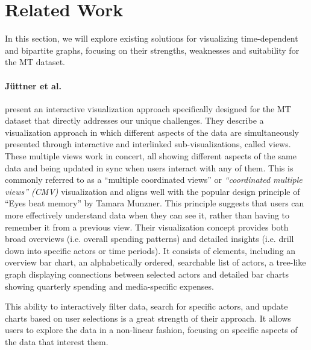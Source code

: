 \documentclass{vgtc}                          %
\begin{document}
\section{Related Work} %


In this section, we will explore existing solutions for visualizing time-dependent and bipartite graphs, focusing on their strengths, weaknesses and suitability for the MT dataset.

\paragraph{Jüttner et al.} \cite{Jttner2017MediaTI} present an interactive visualization approach specifically designed for the MT dataset that directly addresses our unique challenges.
They describe a visualization approach in which different aspects of the data are simultaneously presented through interactive and interlinked sub-visualizations, called views. These multiple views work in concert, all showing different aspects of the same data and being updated in sync when users interact with any of them. This is commonly referred to as a ``multiple coordinated views'' or \textit{``coordinated multiple views'' (CMV)} \cite{roberts2007state} visualization and aligns well with the popular design principle of ``Eyes beat memory'' by Tamara Munzner. This principle suggests that users can more effectively understand data when they can see it, rather than having to remember it from a previous view. Their visualization concept provides both broad overviews (i.e. overall spending patterns) and detailed insights (i.e. drill down into specific actors or time periods). It consists of elements, including an overview bar chart, an alphabetically ordered, searchable list of actors, a tree-like graph displaying connections between selected actors and detailed bar charts showing quarterly spending and media-specific expenses.

This ability to interactively filter data, search for specific actors, and update charts based on user selections is a great strength of their approach. It allows users to explore the data in a non-linear fashion, focusing on specific aspects of the data that interest them.
\end{document}
